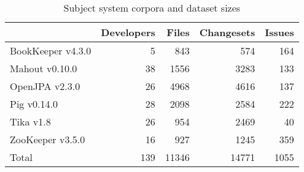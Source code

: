 \begin{table}
\centering
\caption{Subject system corpora and dataset sizes}
\label{table:subjects}
\begin{tabular}{lrrrr}
\toprule
{} &  Developers &  Files &  Changesets &  Issues \\
\midrule
BookKeeper v4.3.0 &           5 &    843 &         574 &     164 \\
Mahout v0.10.0    &          38 &   1556 &        3283 &     133 \\
OpenJPA v2.3.0    &          26 &   4968 &        4616 &     137 \\
Pig v0.14.0       &          28 &   2098 &        2584 &     222 \\
Tika v1.8         &          26 &    954 &        2469 &      40 \\
ZooKeeper v3.5.0  &          16 &    927 &        1245 &     359 \\
\midrule
Total             &         139 &  11346 &       14771 &    1055 \\
\bottomrule
\end{tabular}
\end{table}
